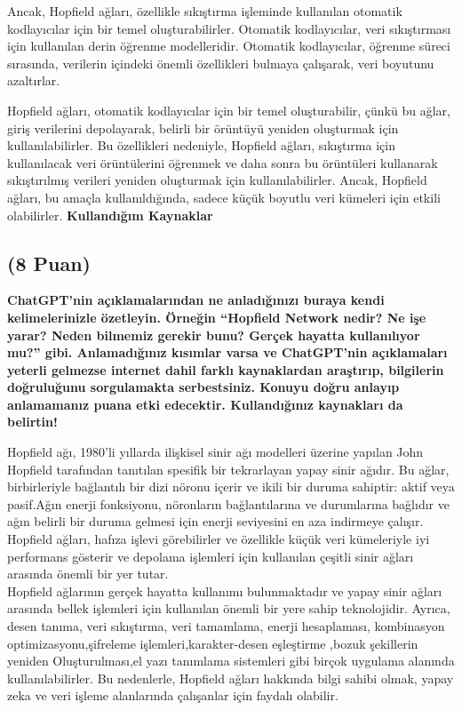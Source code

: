 \documentclass[11pt]{article}
\begin{document}
Ancak, Hopfield ağları, özellikle sıkıştırma işleminde kullanılan otomatik kodlayıcılar için bir temel oluşturabilirler. Otomatik kodlayıcılar, veri sıkıştırması için kullanılan derin öğrenme modelleridir. Otomatik kodlayıcılar, öğrenme süreci sırasında, verilerin içindeki önemli özellikleri bulmaya çalışarak, veri boyutunu azaltırlar.

Hopfield ağları, otomatik kodlayıcılar için bir temel oluşturabilir, çünkü bu ağlar, giriş verilerini depolayarak, belirli bir örüntüyü yeniden oluşturmak için kullanılabilirler. Bu özellikleri nedeniyle, Hopfield ağları, sıkıştırma için kullanılacak veri örüntülerini öğrenmek ve daha sonra bu örüntüleri kullanarak sıkıştırılmış verileri yeniden oluşturmak için kullanılabilirler. Ancak, Hopfield ağları, bu amaçla kullanıldığında, sadece küçük boyutlu veri kümeleri için etkili olabilirler.
\textbf{Kullandığım Kaynaklar}

\subsection{(8 Puan)} \textbf{ChatGPT’nin açıklamalarından ne anladığınızı buraya kendi kelimelerinizle özetleyin. Örneğin ``Hopfield Network nedir? Ne işe yarar? Neden bilmemiz gerekir bunu? Gerçek hayatta kullanılıyor mu?'' gibi. Anlamadığınız kısımlar varsa ve ChatGPT’nin açıklamaları yeterli gelmezse internet dahil farklı kaynaklardan araştırıp, bilgilerin doğruluğunu sorgulamakta serbestsiniz. Konuyu doğru anlayıp anlamamanız puana etki edecektir. Kullandığınız kaynakları da belirtin!}

Hopfield ağı, 1980'li yıllarda ilişkisel sinir ağı modelleri üzerine yapılan John Hopfield tarafından tanıtılan spesifik bir tekrarlayan yapay sinir ağıdır. Bu ağlar, birbirleriyle bağlantılı bir dizi nöronu içerir ve ikili bir duruma sahiptir: aktif veya pasif.Ağın enerji fonksiyonu, nöronların bağlantılarına ve durumlarına bağlıdır ve ağın belirli bir duruma gelmesi için enerji seviyesini en aza indirmeye çalışır. Hopfield ağları, hafıza işlevi görebilirler ve özellikle küçük veri kümeleriyle iyi performans gösterir ve depolama işlemleri için kullanılan çeşitli sinir ağları arasında önemli bir yer tutar.\\

Hopfield ağlarının gerçek hayatta kullanımı bulunmaktadır ve yapay sinir ağları arasında bellek işlemleri için kullanılan önemli bir yere sahip teknolojidir. Ayrıca, desen tanıma, veri sıkıştırma, veri tamamlama, enerji hesaplaması, kombinasyon optimizasyonu,şifreleme işlemleri,karakter-desen eşleştirme
,bozuk şekillerin yeniden Oluşturulması,el yazı tanımlama sistemleri gibi birçok uygulama alanında kullanılabilirler.
Bu nedenlerle, Hopfield ağları hakkında bilgi sahibi olmak, yapay zeka ve veri işleme alanlarında çalışanlar için faydalı olabilir.\\
\end{document}
